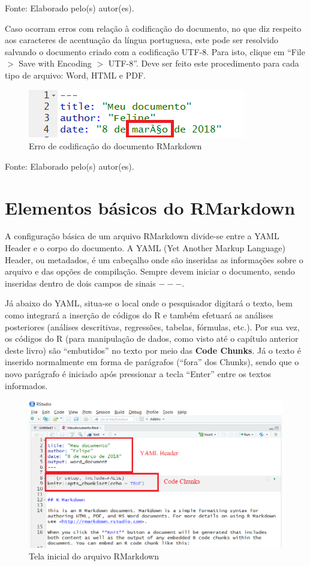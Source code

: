 \documentclass[12pt,brazil,]{book}
\begin{document}
Fonte: Elaborado pelo(s) autor(es).

Caso ocorram erros com relação à codificação do documento, no que diz
respeito aos caracteres de acentuação da língua portuguesa, este pode
ser resolvido salvando o documento criado com a codificação UTF-8. Para
isto, clique em ``File \(>\) Save with Encoding \(>\) UTF-8''. Deve ser
feito este procedimento para cada tipo de arquivo: Word, HTML e PDF.

\begin{figure}

{\centering \includegraphics[width=0.6\linewidth]{errocodif} 

}

\caption{Erro de codificação do documento RMarkdown}\label{fig:errocodif}
\end{figure}

Fonte: Elaborado pelo(s) autor(es).

\hypertarget{elementos-basicos-do-rmarkdown}{%
\section{Elementos básicos do
RMarkdown}\label{elementos-basicos-do-rmarkdown}}

A configuração básica de um arquivo RMarkdown divide-se entre a YAML
Header e o corpo do documento. A YAML (Yet Another Markup Language)
Header, ou metadados, é um cabeçalho onde são inseridas as informações
sobre o arquivo e das opções de compilação. Sempre devem iniciar o
documento, sendo inseridas dentro de dois campos de sinais \(---\).

Já abaixo do YAML, situa-se o local onde o pesquisador digitará o texto,
bem como integrará a inserção de códigos do R e também efetuará as
análises posteriores (análises descritivas, regressões, tabelas,
fórmulas, etc.). Por sua vez, os códigos do R (para manipulação de
dados, como visto até o capítulo anterior deste livro) são ``embutidos''
no texto por meio das \textbf{Code Chunks}. Já o texto é inserido
normalmente em forma de parágrafos (``fora'' dos Chunks), sendo que o
novo parágrafo é iniciado após pressionar a tecla ``Enter'' entre os
textos informados.

\begin{figure}

{\centering \includegraphics[width=0.6\linewidth]{rmark2} 

}

\caption{Tela inicial do arquivo RMarkdown}\label{fig:rmark2}
\end{figure}
\end{document}
